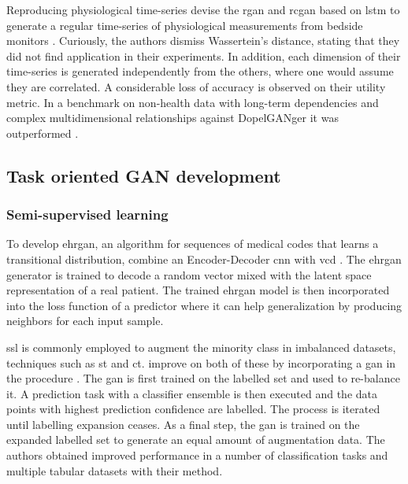              Reproducing physiological time-series \citeauthor{esteban2017real} devise the \gls{rgan} and \gls{rcgan} based on \gls{lstm} to generate a regular time-series of physiological measurements from bedside monitors \cite{esteban2017real}. Curiously, the authors dismiss Wassertein's distance, stating that they did not find application in their experiments. In addition, each dimension of their time-series is generated independently from the others, where one would assume they are correlated. A considerable loss of accuracy is observed on their utility metric. In a benchmark on non-health data with long-term dependencies and complex multidimensional relationships against DopelGANger it was outperformed \cite{Lin2019}. 

    \subsection{Task oriented GAN development}
        \subsubsection{Semi-supervised learning}

            To develop \gls{ehrgan}, an algorithm for sequences of medical codes that learns a transitional distribution, \citeauthor{Che_2017} combine an Encoder-Decoder \gls{cnn} \cite{Rankin2020} with \gls{vcd} \cite{Che_2017}. The \gls{ehrgan} generator is trained to decode a random vector mixed with the latent space representation of a real patient. The trained \gls{ehrgan} model is then incorporated into the loss function of a predictor where it can help generalization by producing neighbors for each input sample.\par
            
            \Gls{ssl} is commonly employed to augment the minority class in imbalanced datasets, techniques such as \gls{st} and \gls{ct}. \citeauthor{yang2018unpaired} improve on both of these by incorporating a \gls{gan} in the procedure \cite{yang2018unpaired}. The \gls{gan} is first trained on the labelled set and used to re-balance it. A prediction task with a classifier ensemble is then executed and the data points with highest prediction confidence are labelled. The process is iterated until labelling expansion ceases. As a final step, the \gls{gan} is trained on the expanded labelled set to generate an equal amount of augmentation data. The authors obtained improved performance in a number of classification tasks and multiple tabular datasets with their method.
    
